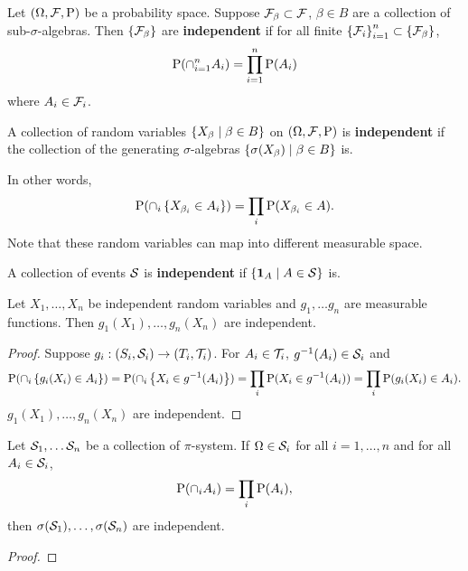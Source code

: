 \begin{definition}
    Let $(\Omega,\F,\P)$ be a probability space. Suppose $\F_\beta\subset\F$, 
    $\beta\in B$ are a collection of sub-$\sigma$-algebras. Then $\set{\F_\beta}$ 
    are \textbf{independent} if for all finite $\set{\F_i}_{i=1}^n\subset\set{\F_\beta}$, 
    \begin{equation*}
        \P(\cap_{i=1}^n A_i) = \prod_{i=1}^{n}\P(A_i) 
    \end{equation*}
    where $A_i\in\F_i$. 
\end{definition}

\begin{definition}
    A collection of random variables $\Set{X_\beta}{\beta\in B}$ on $(\Omega,\F,\P)$ 
    is \textbf{independent} if the collection of the generating $\sigma$-algebras 
    $\Set{\sigma(X_\beta)}{\beta\in B}$ is. 
\end{definition}
\begin{remark}
    In other words, 
    \begin{equation*}
        \P(\cap_i \set{X_{\beta_i}\in A_i}) = \prod_i \P(X_{\beta_i}\in A). 
    \end{equation*}
    Note that these random variables can map into different measurable space. 
\end{remark}

\begin{definition}
    A collection of events $\S$ is \textbf{independent} if $\Set{\one_A}{A\in\S}$ is. 
\end{definition}

\begin{proposition}
    Let $X_1,\dots,X_n$ be independent random variables and $g_1,\ldots g_n$ 
    are measurable functions. Then $g_1(X_1),\ldots,g_n(X_n)$ are independent. 
\end{proposition}
\begin{proof}
    Suppose $g_i:(S_i,\S_i)\to (T_i,\T_i)$. For $A_i\in\T_i$, $g^{-1}(A_i)\in\S_i$ 
    and 
    \begin{equation*}
        \P(\cap_i \set{g_i(X_i)\in A_i}) = \P(\cap_i \set{X_i\in g^{-1}(A_i)}) 
        = \prod_i \P(X_i\in g^{-1}(A_i)) = \prod_i \P(g_i(X_i)\in A_i).
    \end{equation*}
    $g_1(X_1),\ldots,g_n(X_n)$ are independent. 
\end{proof}

\begin{theorem}
    Let $\S_1,\ldots\S_n$ be a collection of $\pi$-system. If $\Omega\in \S_i$ 
    for all $i = 1,\ldots,n$ and for all $A_i\in\S_i$, 
    \begin{equation*}
        \P(\cap_i A_i) = \prod_i \P(A_i), 
    \end{equation*}
    then $\sigma(\S_1),\ldots,\sigma(\S_n)$ are independent. 
\end{theorem}
\begin{proof}
    
\end{proof}